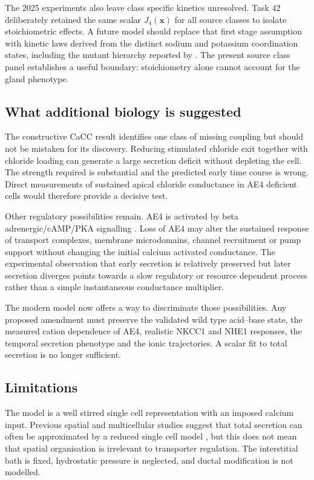 The 2025 experiments also leave class specific kinetics unresolved. Task 42 deliberately retained the same scalar $J_4(\mathbf{x})$ for all source classes to isolate stoichiometric effects. A future model should replace that first stage assumption with kinetic laws derived from the distinct sodium and potassium coordination states, including the mutant hierarchy reported by \citet{Catalan2025}. The present source class panel establishes a useful boundary: stoichiometry alone cannot account for the gland phenotype.

\subsection{What additional biology is suggested}

The constructive CaCC result identifies one class of missing coupling but should not be mistaken for its discovery. Reducing stimulated chloride exit together with chloride loading can generate a large secretion deficit without depleting the cell. The strength required is substantial and the predicted early time course is wrong. Direct measurements of sustained apical chloride conductance in AE4 deficient cells would therefore provide a decisive test.

Other regulatory possibilities remain. AE4 is activated by beta adrenergic/cAMP/PKA signalling \citep{PenaMunzenmayer2021}. Loss of AE4 may alter the sustained response of transport complexes, membrane microdomains, channel recruitment or pump support without changing the initial calcium activated conductance. The experimental observation that early secretion is relatively preserved but later secretion diverges points towards a slow regulatory or resource dependent process rather than a simple instantaneous conductance multiplier.

The modern model now offers a way to discriminate those possibilities. Any proposed amendment must preserve the validated wild type acid--base state, the measured cation dependence of AE4, realistic NKCC1 and NHE1 responses, the temporal secretion phenotype and the ionic trajectories. A scalar fit to total secretion is no longer sufficient.

\subsection{Limitations}

The model is a well stirred single cell representation with an imposed calcium input. Previous spatial and multicellular studies suggest that total secretion can often be approximated by a reduced single cell model \citep{VeraSiguenza2019Fluid,VeraSiguenza2020}, but this does not mean that spatial organisation is irrelevant to transporter regulation. The interstitial bath is fixed, hydrostatic pressure is neglected, and ductal modification is not modelled.


